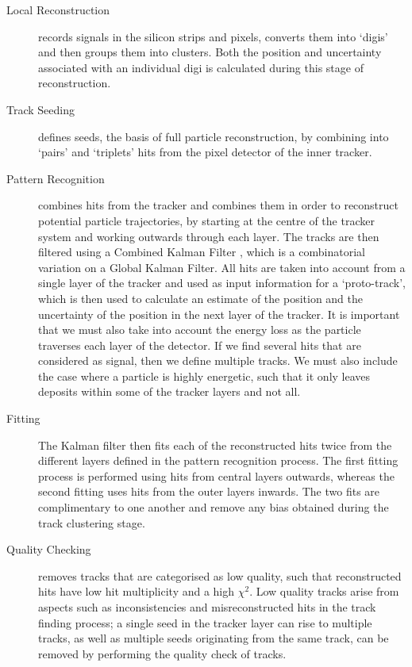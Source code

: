 \begin{description}
	\item[Local Reconstruction] records signals in the silicon strips and pixels, converts them into `digis' and then groups them into clusters. Both the position and uncertainty associated with an individual digi is calculated during this stage of reconstruction.
	\item[Track Seeding] defines seeds, the basis of full particle reconstruction, by combining into `pairs' and `triplets' hits from the pixel detector of the inner tracker.
	\item[Pattern Recognition] combines hits from the tracker and combines them in order to reconstruct potential particle trajectories, by starting at the centre of the tracker system and working outwards through each layer. The tracks are then filtered using a Combined Kalman Filter \cite{Billoir1989390}, which is a combinatorial variation on a Global Kalman Filter. All hits are taken into account from a single layer of the tracker and used as input information for a `proto-track', which is then used to calculate an estimate of the position and the uncertainty of the position in the next layer of the tracker. It is important that we must also take into account the energy loss as the particle traverses each layer of the detector. If we find several hits that are considered as signal, then we define multiple tracks. We must also include the case where a particle is highly energetic, such that it only leaves deposits within some of the tracker layers and not all.
	\item[Fitting] The Kalman filter then fits each of the reconstructed hits twice from the different layers defined in the pattern recognition process. The first fitting process is performed using hits from central layers outwards, whereas the second fitting uses hits from the outer layers inwards. The two fits are complimentary to one another and remove any bias obtained during the track clustering stage.
	\item[Quality Checking] removes tracks that are categorised as low quality, such that reconstructed hits have low hit multiplicity and a high $\chi^2$. Low quality tracks arise from aspects such as inconsistencies and misreconstructed hits in the track finding process; a single seed in the tracker layer can rise to multiple tracks, as well as multiple seeds originating from the same track, can be removed by performing the quality check of tracks. 
\end{description}
 
